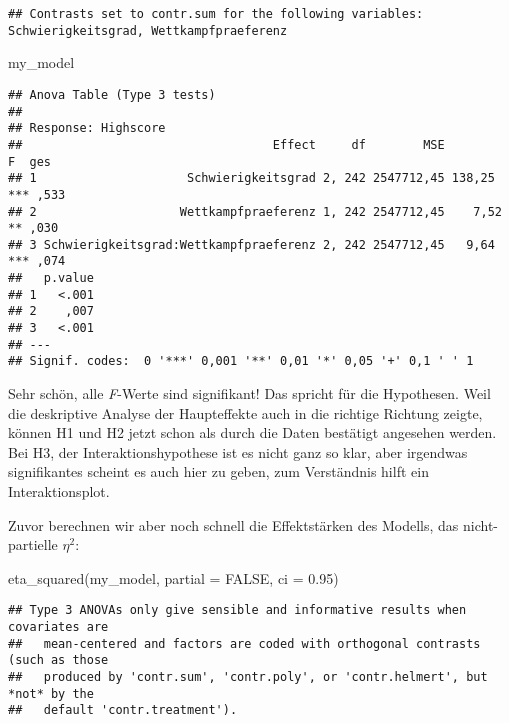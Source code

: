 \documentclass[
]{book}
\newenvironment{Shaded}{\begin{snugshade}}{\end{snugshade}}
\newcommand{\AttributeTok}[1]{\textcolor[rgb]{0.77,0.63,0.00}{#1}}
\newcommand{\ConstantTok}[1]{\textcolor[rgb]{0.00,0.00,0.00}{#1}}
\newcommand{\FloatTok}[1]{\textcolor[rgb]{0.00,0.00,0.81}{#1}}
\newcommand{\FunctionTok}[1]{\textcolor[rgb]{0.00,0.00,0.00}{#1}}
\newcommand{\NormalTok}[1]{#1}
\begin{document}
\begin{verbatim}
## Contrasts set to contr.sum for the following variables: Schwierigkeitsgrad, Wettkampfpraeferenz
\end{verbatim}

\begin{Shaded}
\begin{Highlighting}[]
\NormalTok{my\_model}
\end{Highlighting}
\end{Shaded}

\begin{verbatim}
## Anova Table (Type 3 tests)
## 
## Response: Highscore
##                                   Effect     df        MSE          F  ges
## 1                     Schwierigkeitsgrad 2, 242 2547712,45 138,25 *** ,533
## 2                    Wettkampfpraeferenz 1, 242 2547712,45    7,52 ** ,030
## 3 Schwierigkeitsgrad:Wettkampfpraeferenz 2, 242 2547712,45   9,64 *** ,074
##   p.value
## 1   <.001
## 2    ,007
## 3   <.001
## ---
## Signif. codes:  0 '***' 0,001 '**' 0,01 '*' 0,05 '+' 0,1 ' ' 1
\end{verbatim}

Sehr schön, alle \emph{F}-Werte sind signifikant! Das spricht für die Hypothesen. Weil die deskriptive Analyse der Haupteffekte auch in die richtige Richtung zeigte, können H1 und H2 jetzt schon als durch die Daten bestätigt angesehen werden. Bei H3, der Interaktionshypothese ist es nicht ganz so klar, aber irgendwas signifikantes scheint es auch hier zu geben, zum Verständnis hilft ein Interaktionsplot.

Zuvor berechnen wir aber noch schnell die Effektstärken des Modells, das nicht-partielle \(\eta^2\):

\begin{Shaded}
\begin{Highlighting}[]
\FunctionTok{eta\_squared}\NormalTok{(my\_model, }\AttributeTok{partial =} \ConstantTok{FALSE}\NormalTok{, }\AttributeTok{ci =} \FloatTok{0.95}\NormalTok{)}
\end{Highlighting}
\end{Shaded}

\begin{verbatim}
## Type 3 ANOVAs only give sensible and informative results when covariates are
##   mean-centered and factors are coded with orthogonal contrasts (such as those
##   produced by 'contr.sum', 'contr.poly', or 'contr.helmert', but *not* by the
##   default 'contr.treatment').
\end{verbatim}
\end{document}

